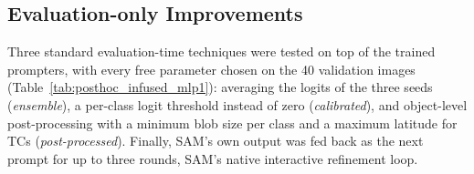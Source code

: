 \subsection{Evaluation-only Improvements}
\label{sec:posthoc}

Three standard evaluation-time techniques were tested on top of the trained prompters, with every free parameter
chosen on the 40 validation images (Table~\ref{tab:posthoc_infused_mlp1}): averaging the logits of the three seeds
(\emph{ensemble}), a per-class logit threshold instead of zero (\emph{calibrated}), and object-level post-processing
with a minimum blob size per class and a maximum latitude for TCs (\emph{post-processed}). Finally, SAM's own output was
fed back as the next prompt for up to three rounds, SAM's native interactive refinement loop.



